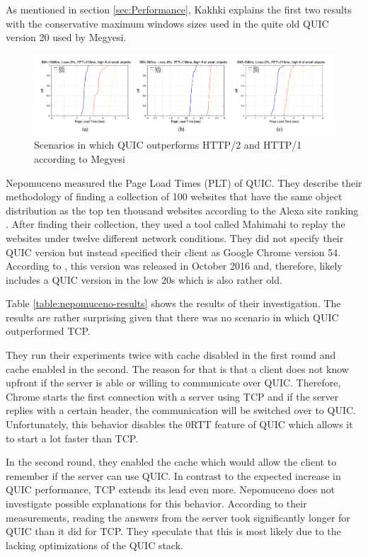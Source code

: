 \documentclass[conference]{IEEEtran}
\begin{document}
As mentioned in section \ref{sec:Performance}, Kakhki explains the first two results with the conservative maximum windows sizes used in the quite old QUIC version 20 used by Megyesi.

\begin{figure}[htbp]
\centerline{\includegraphics[width=\textwidth]{images/Megyesi QUIC wins.png}}
\caption{Scenarios in which QUIC outperforms HTTP/2 and HTTP/1 according to Megyesi \cite{HowQuickIsQuic}}
\label{fig:megyesi-quic-wins}
\end{figure} 

Nepomuceno \cite{Nepomuceno} measured the Page Load Times (PLT) of QUIC. They describe their methodology of finding a collection of 100 websites that have the same object distribution as the top ten thousand websites according to the Alexa site ranking \cite{AlexaRanking}. After finding their collection, they used a tool called Mahimahi to replay the websites under twelve different network conditions. They did not specify their QUIC version but instead specified their client as Google Chrome version 54. According to \cite{ChromeVersionHistory}, this version was released in October 2016 and, therefore, likely includes a QUIC version in the low 20s which is also rather old.

Table \ref{table:nepomuceno-results} shows the results of their investigation. The results are rather surprising given that there was no scenario in which QUIC outperformed TCP. 

They run their experiments twice with cache disabled in the first round and cache enabled in the second. The reason for that is that a client does not know upfront if the server is able or willing to communicate over QUIC. Therefore, Chrome starts the first connection with a server using TCP and if the server replies with a certain header, the communication will be switched over to QUIC. Unfortunately, this behavior disables the 0RTT feature of QUIC which allows it to start a lot faster than TCP.

In the second round, they enabled the cache which would allow the client to remember if the server can use QUIC. In contrast to the expected increase in QUIC performance, TCP extends its lead even more. Nepomuceno does not investigate possible explanations for this behavior. According to their measurements, reading the answers from the server took significantly longer for QUIC than it did for TCP. They speculate that this is most likely due to the lacking optimizations of the QUIC stack.
\end{document}
